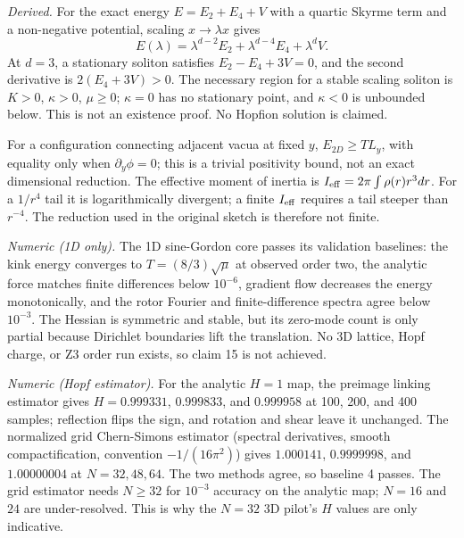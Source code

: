 \documentclass[11pt]{article}
\begin{document}
\emph{Derived.} For the exact energy $E=E_2+E_4+V$ with a quartic Skyrme term
and a non-negative potential, scaling $x\to\lambda x$ gives
\begin{equation}
E(\lambda)=\lambda^{d-2}E_2+\lambda^{d-4}E_4+\lambda^d V.
\end{equation}
At $d=3$, a stationary soliton satisfies $E_2-E_4+3V=0$, and the second
derivative is $2(E_4+3V)>0$. The necessary region for a stable scaling
soliton is $K>0$, $\kappa>0$, $\mu\ge0$; $\kappa=0$ has no stationary point,
and $\kappa<0$ is unbounded below. This is not an existence proof. No Hopfion
solution is claimed.

For a configuration connecting adjacent vacua at fixed $y$,
$E_{2D}\ge T L_y$, with equality only when $\partial_y\phi=0$; this is a
trivial positivity bound, not an exact dimensional reduction. The effective
moment of inertia is $I_{\rm eff}=2\pi\int\rho(r)r^3dr$. For a $1/r^4$ tail
it is logarithmically divergent; a finite $I_{\rm eff}$ requires a tail
steeper than $r^{-4}$. The reduction used in the original sketch is therefore
not finite.

\emph{Numeric (1D only).} The 1D sine-Gordon core passes its validation
baselines: the kink energy converges to $T=(8/3)\sqrt{\mu}$ at observed order
two, the analytic force matches finite differences below $10^{-6}$, gradient
flow decreases the energy monotonically, and the rotor Fourier and
finite-difference spectra agree below $10^{-3}$. The Hessian is symmetric and
stable, but its zero-mode count is only partial because Dirichlet boundaries
lift the translation. No 3D lattice, Hopf charge, or Z3 order run exists, so
claim 15 is not achieved.

\emph{Numeric (Hopf estimator).} For the analytic $H=1$ map, the preimage
linking estimator gives $H=0.999331$, $0.999833$, and $0.999958$ at 100, 200,
and 400 samples; reflection flips the sign, and rotation and shear leave it
unchanged. The normalized grid Chern-Simons estimator (spectral derivatives,
smooth compactification, convention $-1/(16\pi^2)$) gives $1.000141$,
$0.9999998$, and $1.00000004$ at $N=32,48,64$. The two methods agree, so
baseline 4 passes. The grid estimator needs $N\ge32$ for $10^{-3}$ accuracy on
the analytic map; $N=16$ and $24$ are under-resolved. This is why the $N=32$
3D pilot's $H$ values are only indicative.
\end{document}
